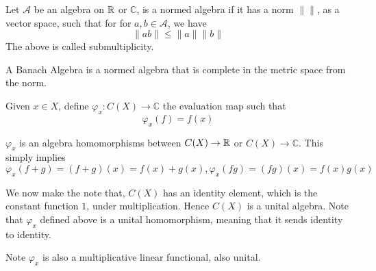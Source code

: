 \begin{definition}
    Let $\mathcal{A}$ be an algebra on $\mathbb{R}$ or $\mathbb{C}$, is a normed algebra if it has a norm $\| \|$, as a vector space, such that for for $a,b\in\mathcal{A}$, we have
    \begin{equation*}
        \|ab\|\leq\|a\|\|b\|
    \end{equation*}
    The above is called submultiplicity.
\end{definition}
\begin{definition}
    A Banach Algebra is a normed algebra that is complete in the metric space from the norm.
\end{definition}


Given $x\in X$, define $\varphi_x: C(X)\to\mathbb{C}$ the evaluation map such that
\begin{equation*}
    \varphi_x(f)=f(x)
\end{equation*}

$\varphi_x$ is an algebra homomorphisms between $C(X)\to\mathbb{R}$ or $C(X)\to\mathbb{C}$. This simply implies
\begin{equation*}
    \varphi_x(f+g)=(f+g)(x)=f(x)+g(x), \varphi_x(fg)=(fg)(x)=f(x)g(x)
\end{equation*}

We now make the note that, $C(X)$ has an identity element, which is the constant function $1$, under multiplication. Hence $C(X)$ is a unital algebra. Note that $\varphi_x$ defined above is a unital homomorphism, meaning that it sends identity to identity.

Note $\varphi_x$ is also a multiplicative linear functional, also unital.

